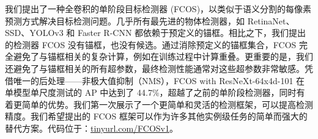 \documentclass[../main.tex]{subfile}
\begin{document}
我们提出了一种全卷积的单阶段目标检测器 (FCOS)，以类似于语义分割的每像素预测方式解决目标检测问题。几乎所有最先进的物体检测器，如 RetinaNet、SSD、YOLOv3 和 Faster R-CNN 都依赖于预定义的锚框。相比之下，我们提出的检测器 FCOS 没有锚框，也没有候选。通过消除预定义的锚框集合，FCOS 完全避免了与锚框相关的复杂计算，例如在训练过程中计算重叠。更重要的是，我们还避免了与锚框相关的所有超参数，最终检测性能通常对这些超参数非常敏感。凭借唯一的后处理——非极大值抑制（NMS），FCOS with ResNeXt-64x4d-101 在单模型单尺度测试的 AP 中达到了 44.7\%，超越了之前的单阶段检测器，同时有着更简单的优势。我们第一次展示了一个更简单和灵活的检测框架，可以提高检测精度。我们希望提出的 FCOS 框架可以作为许多其他实例级任务的简单而强大的替代方案。代码位于：\href{tinyurl.com/FCOSv1}{tinyurl.com/FCOSv1}。
\end{document}
